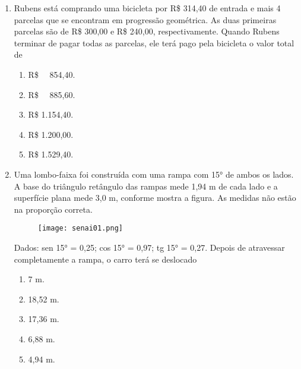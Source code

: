 \documentclass[a4paper,14pt]{article}
\begin{document}
\begin{enumerate}
        \item Rubens está comprando uma bicicleta por R\$ 314,40 de entrada e mais 4 parcelas que se encontram
        em progressão geométrica. As duas primeiras parcelas são de R\$ 300,00 e R\$ 240,00, respectivamente.
        Quando Rubens terminar de pagar todas as parcelas, ele terá pago pela bicicleta o valor total de
        \begin{enumerate}
        	\item R\$ ~~854,40.
        	\item R\$ ~~885,60.
        	\item R\$ 1.154,40.
        	\item R\$ 1.200,00.
        	\item R\$ 1.529,40.
        \end{enumerate}
        \vspace{0cm}
        
        \item Uma lombo-faixa foi construída com uma rampa com 15° de ambos os lados. A base do triângulo
        retângulo das rampas mede 1,94 m de cada lado e a superfície plana mede 3,0 m, conforme mostra a
        figura. As medidas não estão na proporção correta.
        \begin{figure}[h] %
        	\centering
        	\texttt{[image: senai01.png]} %
        \end{figure}
        \newline
        Dados: sen 15° = 0,25;
        cos 15° = 0,97;
        tg 15° = 0,27.
        \newline
        \newline
        Depois de atravessar completamente a rampa, o carro terá se deslocado
        \begin{enumerate}
        	\item 7 m.
        	\item 18,52 m.
        	\item 17,36 m.
        	\item 6,88 m.
        	\item 4,94 m.
        \end{enumerate}
    	\vspace{2cm}
    	

\end{enumerate}
\end{document}
